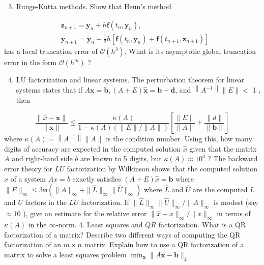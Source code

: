 \documentclass[10pt]{article}
\begin{document}
\begin{enumerate}
  \setcounter{enumi}{2}
  \item Runge-Kutta methods. Show that Heun's method
\end{enumerate}
$$
\begin{aligned}
&\mathbf{z}_{n+1}=\mathbf{y}_{n}+h \mathbf{f}\left(t_{n}, \mathbf{y}_{n}\right), \\
&\mathbf{y}_{n+1}=\mathbf{y}_{n}+\frac{1}{2} h\left[\mathbf{f}\left(t_{n}, \mathbf{y}_{n}\right)+\mathbf{f}\left(t_{n+1}, \mathbf{z}_{n+1}\right)\right]
\end{aligned}
$$
has a local truncation error of $\mathcal{O}\left(h^{3}\right)$. What is its asymptotic global truncation error in the form $\mathcal{O}\left(h^{m}\right)$ ?

\begin{enumerate}
  \setcounter{enumi}{3}
  \item LU factorization and linear systems. The perturbation theorem for linear systems states that if $A \boldsymbol{x}=\boldsymbol{b},(A+E) \widehat{\boldsymbol{x}}=\boldsymbol{b}+\boldsymbol{d}$, and $\left\|A^{-1}\right\|\|E\|<$ 1 , then
\end{enumerate}
$$
\frac{\|\hat{x}-\boldsymbol{x}\|}{\|\boldsymbol{x}\|} \leq \frac{\kappa(A)}{1-\kappa(A)(\|E\| /\|A\|)}\left[\frac{\|E\|}{\|A\|}+\frac{\|d\|}{\|\boldsymbol{b}\|}\right]
$$
where $\kappa(A)=\left\|A^{-1}\right\|\|A\|$ is the condition number. Using this, how many digits of accuracy are expected in the computed solution $\widehat{x}$ given that the matrix $A$ and right-hand side $b$ are known to 5 digits, but $\kappa(A) \approx 10^{3}$ ? The backward error theory for $L U$ factorization by Wilkinson shows that the computed solution $\hat{x}$ of a system $A x=b$ exactly satisfies $(A+E) \widehat{x}=\boldsymbol{b}$ where $\|E\|_{\infty} \leq 3 \mathbf{u}\left(\|A\|_{\infty}+\|\widehat{L}\|_{\infty}\|\widehat{U}\|_{\infty}\right)$ where $\widehat{L}$ and $\widehat{U}$ are the computed $L$ and $U$ factors in the $L U$ factorization. If $\|\widehat{L}\|_{\infty}\|\widehat{U}\|_{\infty} /\|A\|_{\infty}$ is modest (say $\approx 10$ ), give an estimate for the relative error $\|\widehat{x}-x\|_{\infty} /\|x\|_{\infty}$ in terms of $\kappa(A)$ in the $\infty$-norm. 4. Least squares and $Q R$ factorization. What is a QR factorization of a matrix? Describe two different ways of computing the QR factorization of an $m \times n$ matrix. Explain how to use a QR factorization of a matrix to solve a least squares problem $\min _{\mathbf{x}}\|A \mathbf{x}-\mathbf{b}\|_{2}$.
\end{document}
